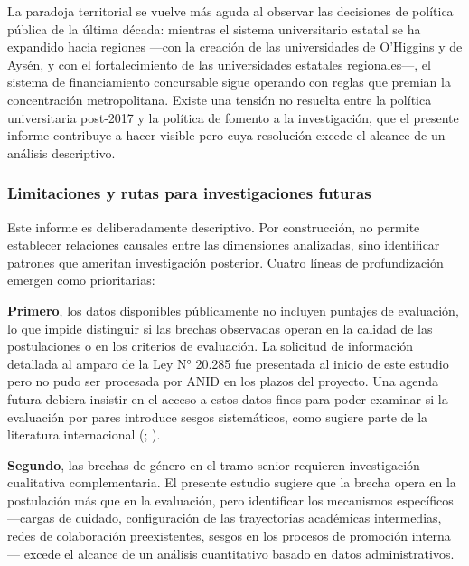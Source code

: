 \documentclass[
  12pt,
  letterpaper,
]{article}
\begin{document}
La paradoja territorial se vuelve más aguda al observar las decisiones
de política pública de la última década: mientras el sistema
universitario estatal se ha expandido hacia regiones ---con la creación
de las universidades de O'Higgins y de Aysén, y con el fortalecimiento
de las universidades estatales regionales---, el sistema de
financiamiento concursable sigue operando con reglas que premian la
concentración metropolitana. Existe una tensión no resuelta entre la
política universitaria post-2017 y la política de fomento a la
investigación, que el presente informe contribuye a hacer visible pero
cuya resolución excede el alcance de un análisis descriptivo.

\subsubsection{Limitaciones y rutas para investigaciones
futuras}\label{limitaciones-y-rutas-para-investigaciones-futuras}

Este informe es deliberadamente descriptivo. Por construcción, no
permite establecer relaciones causales entre las dimensiones analizadas,
sino identificar patrones que ameritan investigación posterior. Cuatro
líneas de profundización emergen como prioritarias:

\textbf{Primero}, los datos disponibles públicamente no incluyen
puntajes de evaluación, lo que impide distinguir si las brechas
observadas operan en la calidad de las postulaciones o en los criterios
de evaluación. La solicitud de información detallada al amparo de la Ley
N° 20.285 fue presentada al inicio de este estudio pero no pudo ser
procesada por ANID en los plazos del proyecto. Una agenda futura debiera
insistir en el acceso a estos datos finos para poder examinar si la
evaluación por pares introduce sesgos sistemáticos, como sugiere parte
de la literatura internacional
(;
).

\textbf{Segundo}, las brechas de género en el tramo senior requieren
investigación cualitativa complementaria. El presente estudio sugiere
que la brecha opera en la postulación más que en la evaluación, pero
identificar los mecanismos específicos ---cargas de cuidado,
configuración de las trayectorias académicas intermedias, redes de
colaboración preexistentes, sesgos en los procesos de promoción
interna--- excede el alcance de un análisis cuantitativo basado en datos
administrativos.
\end{document}
